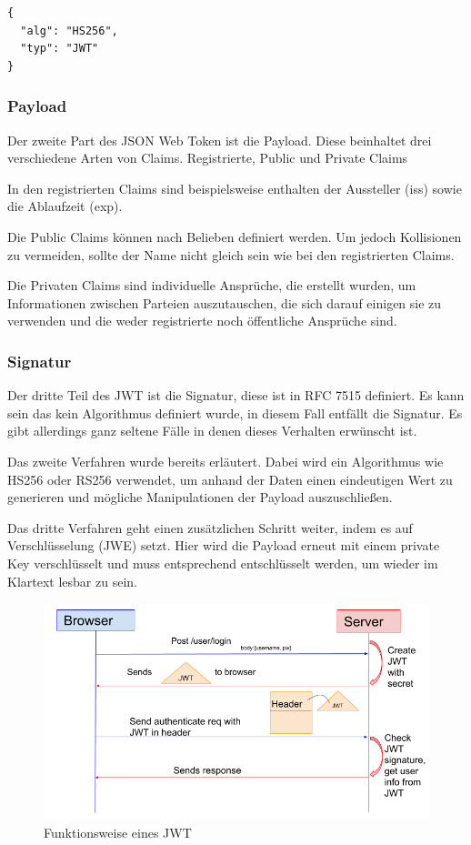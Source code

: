 \begin{lstlisting}
{
  "alg": "HS256",
  "typ": "JWT"
}
\end{lstlisting}

\subsubsection{Payload}
Der zweite Part des JSON Web Token ist die Payload. Diese beinhaltet drei verschiedene Arten von Claims. 
Registrierte, Public und Private Claims

In den registrierten Claims sind beispielsweise enthalten der Aussteller (iss) sowie die Ablaufzeit (exp).

Die Public Claims können nach Belieben definiert werden. Um jedoch Kollisionen zu vermeiden, sollte der Name nicht gleich sein wie bei den registrierten Claims.

Die Privaten Claims sind individuelle Ansprüche, die erstellt wurden, um Informationen zwischen Parteien auszutauschen, die sich darauf einigen sie zu verwenden und die weder registrierte noch öffentliche Ansprüche sind.


\subsubsection{Signatur}

Der dritte Teil des JWT ist die Signatur, diese ist in RFC 7515 definiert. Es kann sein das kein Algorithmus definiert wurde, in diesem Fall entfällt die Signatur. Es gibt allerdings ganz seltene Fälle in denen dieses Verhalten erwünscht ist. 



Das zweite Verfahren wurde bereits erläutert. Dabei wird ein Algorithmus wie HS256 oder RS256 verwendet, um anhand der Daten einen eindeutigen Wert zu generieren und mögliche Manipulationen der Payload auszuschließen.



Das dritte Verfahren geht einen zusätzlichen Schritt weiter, indem es auf Verschlüsselung (JWE) setzt. Hier wird die Payload erneut mit einem private Key verschlüsselt und muss entsprechend entschlüsselt werden, um wieder im Klartext lesbar zu sein. \cite{JWT_3}


\begin{figure}[h!]
    \centering
    \includegraphics[width=0.7\linewidth]{pics/jwt-funktion.png}
    \caption{Funktionsweise eines JWT}
    \label{fig:enter-label}
\end{figure}

